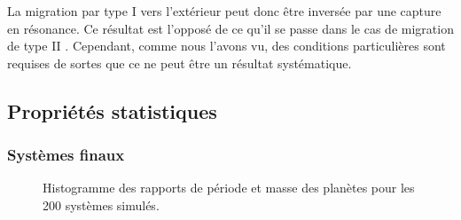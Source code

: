 La migration par type I vers l'extérieur peut donc être inversée par une capture en résonance. Ce résultat est l'opposé de ce qu'il se passe dans le cas de migration de type II \citep[grand tack model]{morbidelli2007dynamics, pierens2011twophase}. Cependant, comme nous l'avons vu, des conditions particulières sont requises de sortes que ce ne peut être un résultat systématique.


\subsection{Propriétés statistiques}
\subsubsection{Systèmes finaux}
\begin{figure}[htbp]
\centering
{}\hfill
{}

\caption{Histogramme des rapports de période et masse des planètes pour les 200 systèmes simulés.}
\end{figure}

